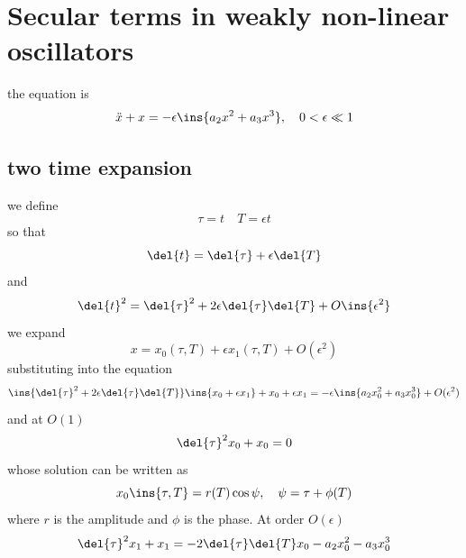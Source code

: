 \clearpage
\section{Secular terms in weakly non-linear oscillators}
the equation is 
\begin{equation}
    \ddot{x}+x = -\epsilon\ins{a_2 x^2+a_3x^3},\quad 0<\epsilon\ll1
\end{equation}
\subsection{two time expansion}
we define 
\begin{equation}
    \tau = t \quad T=\epsilon t
\end{equation}
so that 
\begin{equation}
    \del{t}=\del{\tau}+\epsilon\del{T}
\end{equation}
and 
\begin{equation}
    \del{t}^2=\del{\tau}^2+2\epsilon\del{\tau}\del{T}+O\ins{\epsilon^2}
\end{equation}
we expand 
\begin{equation}
    x = x_0(\tau,T)+\epsilon x_1(\tau, T)+O(\epsilon^2)
\end{equation}
substituting into the equation
\begin{equation}
    \ins{\del{\tau}^2+2\epsilon\del{\tau}\del{T}}\ins{x_0+\epsilon x_1}+x_0+\epsilon x_1 = -\epsilon\ins{a_2x_0^2+a_3x_0^3}+O(\epsilon^2)
\end{equation}
and at \(O(1)\)
\begin{equation}
    \del{\tau}^2 x_0+x_0=0
\end{equation}
whose solution can be written as 
\begin{equation}
    x_0\ins{\tau,T}=r(T)\cos\psi,\quad \psi=\tau+\phi(T)
\end{equation}
where \(r\) is the amplitude and \(\phi\) is the phase. At order \(O(\epsilon)\)
\begin{equation}
    \del{\tau}^2x_1+x_1 = -2\del{\tau}\del{T}x_0-a_2x_0^2-a_3x_0^3
\end{equation}
